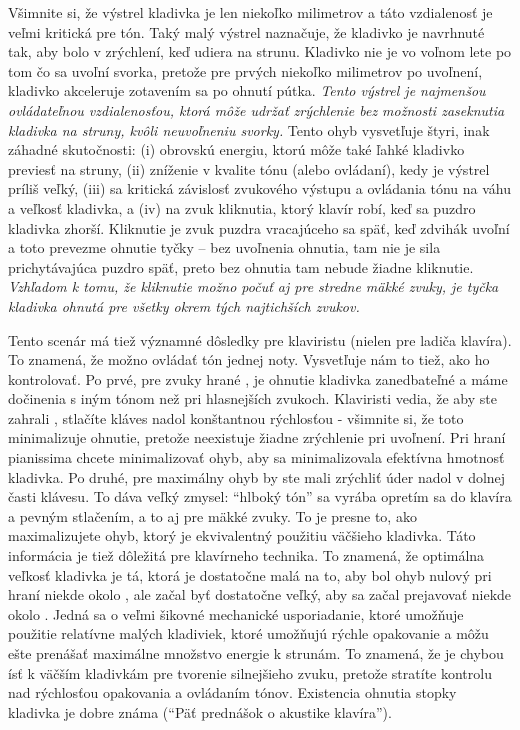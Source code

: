 Všimnite si, že výstrel kladivka je len niekoľko milimetrov a táto vzdialenosť je veľmi kritická pre tón. Taký malý výstrel naznačuje, že kladivko je navrhnuté tak, aby bolo v zrýchlení, keď udiera na strunu. Kladivko nie je vo voľnom lete po tom čo sa uvoľní svorka, pretože pre prvých niekoľko milimetrov po uvoľnení, kladivko akceleruje zotavením sa po ohnutí pútka. \emph{Tento výstrel je najmenšou ovládateľnou vzdialenosťou, ktorá môže udržať zrýchlenie bez možnosti zaseknutia kladivka na struny, kvôli neuvoľneniu svorky.} Tento ohyb vysvetľuje štyri, inak záhadné skutočnosti: (i) obrovskú energiu, ktorú môže také ľahké kladivko previesť na struny, (ii) zníženie v kvalite tónu (alebo ovládaní), kedy je výstrel príliš veľký, (iii) sa kritická závislosť zvukového výstupu a ovládania tónu na váhu a veľkosť kladivka, a (iv) na zvuk kliknutia, ktorý klavír robí, keď sa puzdro kladivka zhorší. Kliknutie je zvuk puzdra vracajúceho sa späť, keď zdvihák uvoľní a toto prevezme ohnutie tyčky – bez uvoľnenia ohnutia, tam nie je sila prichytávajúca puzdro späť, preto bez ohnutia tam nebude žiadne kliknutie. \emph{Vzhľadom k tomu, že kliknutie možno počuť aj pre stredne mäkké zvuky, je tyčka kladivka ohnutá pre všetky okrem tých najtichších zvukov.}

Tento scenár má tiež významné dôsledky pre klaviristu (nielen pre ladiča klavíra). To znamená, že možno ovládať tón jednej noty. Vysvetľuje nám to tiež, ako ho kontrolovať. Po prvé, pre zvuky hrané , je ohnutie kladivka zanedbateľné a máme dočinenia s iným tónom než pri hlasnejších zvukoch. Klaviristi vedia, že aby ste zahrali , stlačíte kláves nadol konštantnou rýchlosťou - všimnite si, že toto minimalizuje ohnutie, pretože neexistuje žiadne zrýchlenie pri uvoľnení. Pri hraní pianissima chcete minimalizovať ohyb, aby sa minimalizovala efektívna hmotnosť kladivka. Po druhé, pre maximálny ohyb by ste mali zrýchliť úder nadol v dolnej časti klávesu. To dáva veľký zmysel: “hlboký tón” sa vyrába opretím sa do klavíra a pevným stlačením, a to aj pre mäkké zvuky. To je presne to, ako maximalizujete ohyb, ktorý je ekvivalentný použitiu väčšieho kladivka. Táto informácia je tiež dôležitá pre klavírneho technika. To znamená, že optimálna veľkosť kladivka je tá, ktorá je dostatočne malá na to, aby bol ohyb nulový pri hraní niekde okolo , ale začal byť dostatočne veľký, aby sa začal prejavovať niekde okolo . Jedná sa o veľmi šikovné mechanické usporiadanie, ktoré umožňuje použitie relatívne malých kladiviek, ktoré umožňujú rýchle opakovanie a môžu ešte prenášať maximálne množstvo energie k strunám. To znamená, že je chybou ísť k väčším kladivkám pre tvorenie silnejšieho zvuku, pretože stratíte kontrolu nad rýchlosťou opakovania a ovládaním tónov. Existencia ohnutia stopky kladivka je dobre známa (“Päť prednášok o akustike klavíra”).

